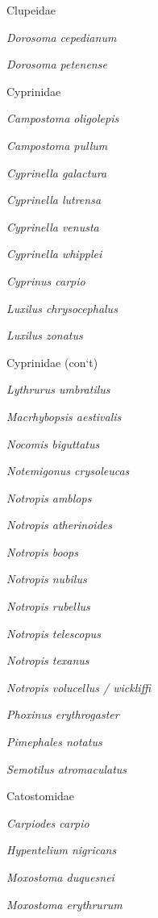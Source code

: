 \documentclass[11pt]{article}
\begin{document}
\begin{multicols}{2}
Clupeidae\par
	\quad\textit{Dorosoma cepedianum}\par
	\quad\textit{Dorosoma petenense}\par
\vspace{1ex}
Cyprinidae\par
	\quad\textit{Campostoma oligolepis}\par
	\quad\textit{Campostoma pullum}\par
	\quad\textit{Cyprinella galactura}\par
	\quad\textit{Cyprinella lutrensa}\par
	\quad\textit{Cyprinella venusta}\par
	\quad\textit{Cyprinella whipplei}\par
	\quad\textit{Cyprinus carpio}\par
	\quad\textit{Luxilus chrysocephalus}\par
	\quad\textit{Luxilus zonatus}\par
\vspace{1ex}
Cyprinidae (con‘t)\par
	\quad\textit{Lythrurus umbratilus}\par
	\quad\textit{Macrhybopsis aestivalis}\par
	\quad\textit{Nocomis biguttatus}\par
	\quad\textit{Notemigonus crysoleucas}\par
	\quad\textit{Notropis amblops}\par
	\quad\textit{Notropis atherinoides}\par
	\quad\textit{Notropis boops}\par
	\quad\textit{Notropis nubilus}\par
	\quad\textit{Notropis rubellus}\par
	\quad\textit{Notropis telescopus}\par
	\quad\textit{Notropis texanus}\par
	\quad\textit{Notropis volucellus / wickliffi}\par
	\quad\textit{Phoxinus erythrogaster}\par
	\quad\textit{Pimephales notatus}\par
	\quad\textit{Semotilus atromaculatus}\par
\vspace{1ex}

Catostomidae\par
	\quad\textit{Carpiodes carpio}\par
	\quad\textit{Hypentelium nigricans}\par
	\quad\textit{Moxostoma duquesnei}\par
	\quad\textit{Moxostoma erythrurum}\par
\vspace{1ex}


\end{multicols}
\end{document}
